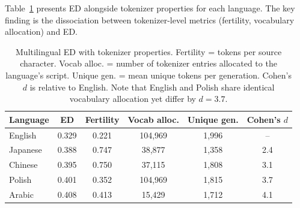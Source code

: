 \documentclass{article}
\begin{document}
Table~\ref{tab:multilingual} presents ED alongside tokenizer properties for each language. The key finding is the dissociation between tokenizer-level metrics (fertility, vocabulary allocation) and ED.

\begin{table}[H]
\centering
\small
\begin{tabular}{lccccc}
\toprule
\textbf{Language} & \textbf{ED} & \textbf{Fertility} & \textbf{Vocab alloc.} & \textbf{Unique gen.} & \textbf{Cohen's $d$} \\
\midrule
English & 0.329 & 0.221 & 104,969 & 1,996 & -- \\
Japanese & 0.388 & 0.747 & 38,877 & 1,358 & 2.4 \\
Chinese & 0.395 & 0.750 & 37,115 & 1,808 & 3.1 \\
Polish & 0.401 & 0.352 & 104,969 & 1,815 & 3.7 \\
Arabic & 0.408 & 0.413 & 15,429 & 1,712 & 4.1 \\
\bottomrule
\end{tabular}
\caption{Multilingual ED with tokenizer properties. Fertility = tokens per source character. Vocab alloc. = number of tokenizer entries allocated to the language's script. Unique gen. = mean unique tokens per generation. Cohen's $d$ is relative to English. Note that English and Polish share identical vocabulary allocation yet differ by $d = 3.7$.}
\label{tab:multilingual}
\end{table}
\end{document}
